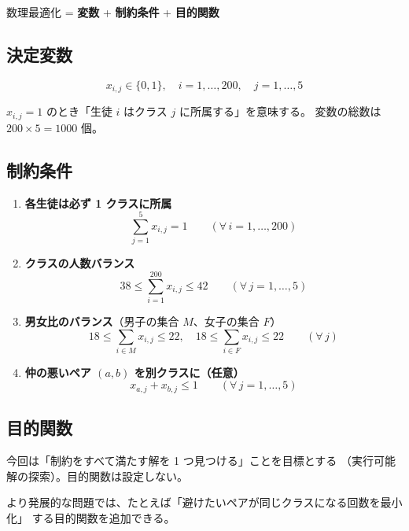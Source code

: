 \documentclass[a4paper, 11pt, fleqn]{ltjsarticle}
\begin{document}
\begin{tcolorbox}[colback=gray!5, colframe=gray!40]
  数理最適化 = \textbf{変数} + \textbf{制約条件} + \textbf{目的関数}
\end{tcolorbox}

\subsection{決定変数}

\[
  x_{i,j} \in \{0, 1\}, \quad i = 1, \ldots, 200, \quad j = 1, \ldots, 5
\]

$x_{i,j} = 1$ のとき「生徒 $i$ はクラス $j$ に所属する」を意味する。
変数の総数は $200 \times 5 = 1000$ 個。

\subsection{制約条件}

\begin{enumerate}[label=\textbf{制約\arabic*.}]

  \item \textbf{各生徒は必ず 1 クラスに所属}
  \[
    \sum_{j=1}^{5} x_{i,j} = 1 \qquad (\forall\, i = 1, \ldots, 200)
  \]

  \item \textbf{クラスの人数バランス}
  \[
    38 \leq \sum_{i=1}^{200} x_{i,j} \leq 42 \qquad (\forall\, j = 1, \ldots, 5)
  \]

  \item \textbf{男女比のバランス}（男子の集合 $M$、女子の集合 $F$）
  \[
    18 \leq \sum_{i \in M} x_{i,j} \leq 22, \quad
    18 \leq \sum_{i \in F} x_{i,j} \leq 22 \qquad (\forall\, j)
  \]

  \item \textbf{仲の悪いペア $(a, b)$ を別クラスに（任意）}
  \[
    x_{a,j} + x_{b,j} \leq 1 \qquad (\forall\, j = 1, \ldots, 5)
  \]

\end{enumerate}

\subsection{目的関数}

今回は「制約をすべて満たす解を 1 つ見つける」ことを目標とする
（実行可能解の探索）。目的関数は設定しない。

より発展的な問題では、たとえば「避けたいペアが同じクラスになる回数を最小化」
する目的関数を追加できる。
\end{document}
